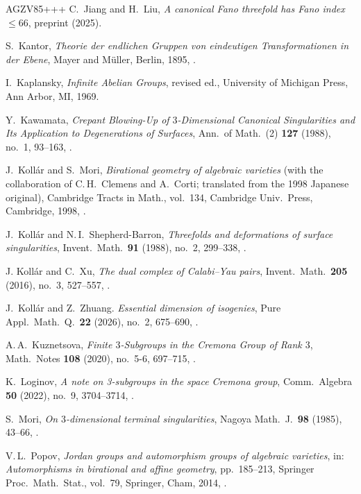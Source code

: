 \begin{thebibliography}{AGZV85+++}
C.~Jiang and H.~Liu,
{\em A canonical Fano threefold has Fano index $\leq66$}, 
preprint  (2025).

S.~Kantor,
{\em Theorie der endlichen Gruppen von eindeutigen Transformationen in der Ebene}, Mayer and M\"uller, Berlin, 1895,
.

I.~Kaplansky,
{\em Infinite Abelian Groups}, revised ed.,
University of Michigan Press, Ann Arbor, MI, 1969.

Y.~Kawamata,
 {\em Crepant Blowing-Up of $3$-Dimensional Canonical Singularities and Its Application to Degenerations of Surfaces}, 
 Ann.\ of Math.~(2) \textbf{127} (1988), no.~1, 93--163,
 .

  J.~Koll\'{a}r and S.~Mori,
  {\em Birational geometry of algebraic varieties} 
 (with the collaboration of C.\,H.~Clemens and A.~Corti; translated from the 1998 Japanese original), Cambridge Tracts in Math., vol.~134, Cambridge Univ.\ Press, Cambridge, 1998, .

J.~Koll\'ar and N.\,I.~Shepherd-Barron,
 {\em Threefolds and deformations of surface singularities},
 Invent.\ Math.\ \textbf{91} (1988), no.~2, 299--338,
.
 
J. Koll\'{a}r and C.~Xu,
 {\em The dual complex of Calabi--Yau pairs}, 
 Invent.\ Math.\ \textbf{205} (2016), no.~3, 527--557,
 .

J.~Koll\'{a}r and Z.~Zhuang.
{\em Essential dimension of isogenies},
Pure Appl.\ Math.~Q.\ \textbf{22} (2026), no.~2, 675--690,
.


A.\,A.~Kuznetsova, 
 {\em Finite $3$-Subgroups in the Cremona Group of Rank $3$},
 Math.\ Notes \textbf{108} (2020), no.~5-6, 697--715,
 .

K.~Loginov, 
 {\em A note on 3-subgroups in the space Cremona group}, 
 Comm.\ Algebra \textbf{50} (2022), no.~9, 3704--3714,
 .

S.~Mori, 
 {\em On $3$-dimensional terminal singularities}, 
 Nagoya Math.~J.\ \textbf{98} (1985), 43--66,
 .

V.\,L.~Popov,
 {\em Jordan groups and automorphism groups of algebraic varieties}, 
 in: {\em Automorphisms in birational and affine geometry}, pp.~185--213, Springer Proc.\ Math.\ Stat., vol.~79, Springer, Cham, 2014,
 .
  

\end{thebibliography}
